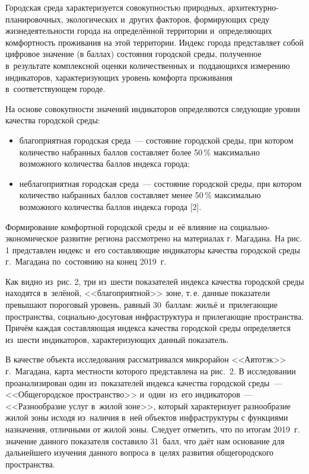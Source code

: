 Городская среда характеризуется совокупностью природных, ар\-хи\-тек\-тур\-но-пла\-ни\-ро\-воч\-ных, экологических и~других факторов, формирующих среду жизнедеятельности города на определённой территории и~определяющих комфортность проживания на этой территории. Индекс города представляет собой цифровое значение (в баллах) состояния городской среды, полученное в~результате комплексной оценки количественных и~поддающихся измерению индикаторов, характеризующих уровень комфорта проживания в~соответствующем городе.

На основе совокупности значений индикаторов определяются следующие уровни качества городской среды:
\begin{itemize}[noitemsep]\vspace{-8pt}
  \item благоприятная городская среда~--- состояние городской среды, при котором количество набранных баллов составляет более 50\,\% максимально возможного количества баллов индекса города;
  \item неблагоприятная городская среда~--- состояние городской среды, при котором количество набранных баллов составляет менее 50\,\% максимально возможного количества баллов индекса города [2].
\end{itemize}
 \vspace{-8pt}\enlargethispage{\baselineskip}
Формирование комфортной городской среды и~её влияние на социально-экономическое развитие региона рассмотрено на материалах г. Магадана. На рис. 1 представлен индекс и~его составляющие индикаторы качества городской среды г.~Магадана по~состоянию на конец 2019~г.



Как видно из~рис. 2, три из~шести показателей индекса качества
городской среды находятся в~зелёной, <<благоприятной>> зоне, т.\,е. данные показатели превышают пороговый уровень, равный 30~баллам: жильё и~прилегающие пространства, социально-досуговая инфраструктура и
прилегающие пространства. Причём каждая составляющая индекса качества
городской среды определяется из~шести индикаторов, характеризующих
данный показатель.

В качестве объекта исследования рассматривался микрорайон <<Автотэк>> г.~Магадана, карта местности которого представлена на рис.~2. В исследовании проанализирован один из~показателей индекса
качества городской среды~--- <<Общегородское пространство>> и~один~из~его
индикаторов~--- <<Разнообразие услуг в~жилой зоне>>, который характеризует
разнообразие жилой зоны исходя из~наличия в~ней объектов инфраструктуры
с функциями назначения, отличными от жилой зоны. Следует отметить, что
по итогам 2019~г. значение данного показателя составило 31~балл, что
даёт нам основание для дальнейшего изучения данного вопроса в~целях
развития общегородского пространства.


